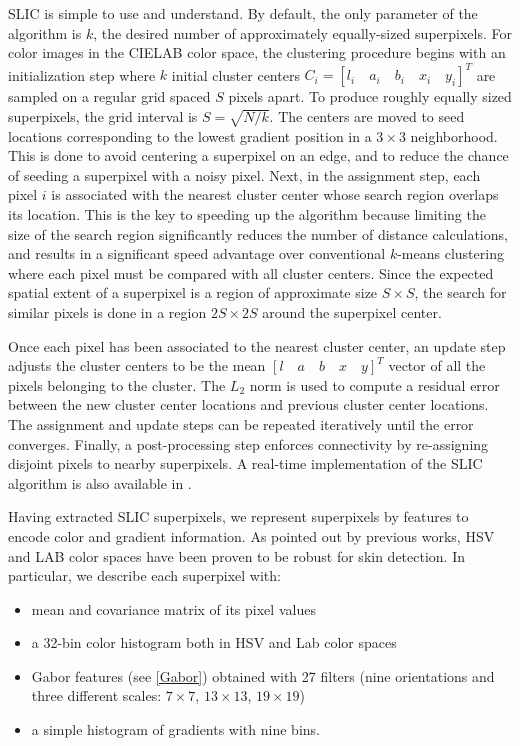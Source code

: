 SLIC is simple to use and understand. By default, the only parameter of the algorithm is $k$, the desired number of approximately equally-sized superpixels. For color images in the CIELAB color space, the clustering procedure begins with an initialization step where $k$ initial cluster centers $C_i = [l_i \quad a_i \quad b_i \quad x_i \quad y_i]^T$ are sampled on a regular grid spaced $S$ pixels apart. To produce roughly equally sized superpixels, the grid interval is $S =\sqrt{N/k}$. The centers are moved to seed locations corresponding to the lowest gradient position in a $3\times 3$ neighborhood. This is done to avoid centering a superpixel on an edge, and to reduce the chance of seeding a superpixel with a noisy pixel. Next, in the assignment step, each pixel $i$ is associated with the nearest cluster center whose search region overlaps its location. This is the key to speeding up the algorithm because limiting the size of the search region
significantly reduces the number of distance calculations, and results in a significant speed advantage over conventional $k$-means clustering where each pixel must be compared with all cluster centers. Since the expected spatial extent of a superpixel is a region of
approximate size $S\times S$, the search for similar pixels is done in a region $2S \times 2S$ around the superpixel center.

Once each pixel has been associated to the nearest cluster center, an update step adjusts the cluster centers to be the mean
$[l \quad a \quad b \quad x \quad y]^T$ vector of all the pixels belonging to the cluster. The $L_2$ norm is used to compute a residual error  between
the new cluster center locations and previous cluster center locations. The assignment and update steps can be repeated
iteratively until the error converges. Finally, a post-processing step enforces connectivity by re-assigning disjoint pixels to
nearby superpixels. A real-time implementation of the SLIC algorithm is also available in \cite{YHRengSLIC}.

Having extracted SLIC superpixels, we represent superpixels by features to encode color and gradient information. As pointed out by previous works, HSV and LAB color spaces have been proven to be robust for skin detection. 
In particular, we describe each superpixel with:
\begin{itemize} 
\item mean and covariance matrix of its pixel values
\item a 32-bin color histogram both in HSV and Lab color spaces
\item Gabor features (see \ref{Gabor}) obtained with 27 filters (nine orientations and three different scales: $7 \times 7$, $13 \times 13$, $19 \times 19$) 
\item a simple histogram of gradients with nine bins. 
\end{itemize}

